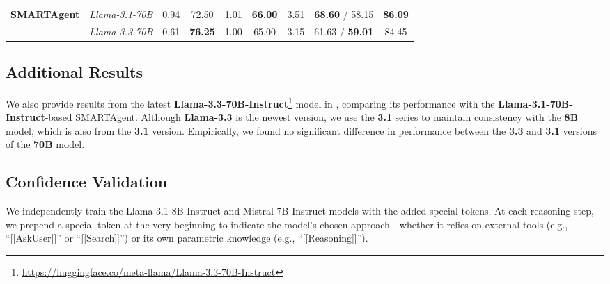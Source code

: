 \begin{table*}[t]
{\begin{tabular}{l @{\hskip 14pt} l c c @{\hskip 14pt} c c @{\hskip 14pt} c c c}
        
        


        \multirow{2}{*}{\textbf{SMARTAgent}} & \textit{Llama-3.1-70B} & 0.94 & 72.50 & 1.01 & \textbf{66.00} & 3.51 & \textbf{68.60} / 58.15 & \textbf{86.09} \\
        ~ & \textit{Llama-3.3-70B} & 0.61 & \textbf{76.25} & 1.00 & 65.00 & 3.15 & 61.63 / \textbf{59.01} & 84.45 \\
        
        \bottomrule
    \end{tabular}
    }
    \label{tab:result_apdx}
    \caption{
    Performance of SMARTAgent when using Llama-3.3-70B-Instruct as the base model, compared to the original results with its Llama-3.1-70B-Instruct counterpart.
    }
\end{table*}


\subsection{Additional Results}
We also provide results from the latest \textbf{Llama-3.3-70B-Instruct}\footnote{\url{https://huggingface.co/meta-llama/Llama-3.3-70B-Instruct}} model in , comparing its performance with the \textbf{Llama-3.1-70B-Instruct}-based SMARTAgent. Although \textbf{Llama-3.3} is the newest version, we use the \textbf{3.1} series to maintain consistency with the \textbf{8B} model, which is also from the \textbf{3.1} version. Empirically, we found no significant difference in performance between the \textbf{3.3} and \textbf{3.1} versions of the \textbf{70B} model.


\subsection{Confidence Validation}
\label{apdx:confidence}
We independently train the Llama-3.1-8B-Instruct and Mistral-7B-Instruct models with the added special tokens. At each reasoning step, we prepend a special token at the very beginning to indicate the model’s chosen approach—whether it relies on external tools (e.g., ``[[AskUser]]'' or ``[[Search]]'') or its own parametric knowledge (e.g., ``[[Reasoning]]'').

